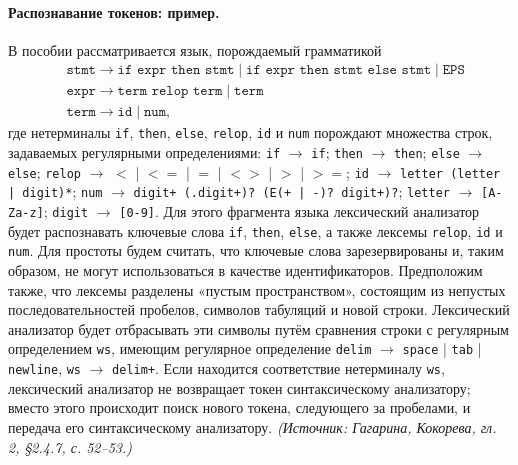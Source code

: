 \documentclass[a4paper,12pt]{article}
\begin{document}
\paragraph{Распознавание токенов: пример.}
В пособии рассматривается язык, порождаемый грамматикой
\[
\begin{aligned}
&\texttt{stmt}\to\texttt{if expr then stmt}\mid\texttt{if expr then stmt else stmt}\mid\texttt{EPS}\\
&\texttt{expr}\to\texttt{term relop term}\mid\texttt{term}\\
&\texttt{term}\to\texttt{id}\mid\texttt{num},
\end{aligned}
\]
где нетерминалы \texttt{if}, \texttt{then}, \texttt{else}, \texttt{relop}, \texttt{id} и \texttt{num} порождают множества строк, задаваемых регулярными определениями: \texttt{if} \(\to\) \texttt{if}; \texttt{then} \(\to\) \texttt{then}; \texttt{else} \(\to\) \texttt{else}; \texttt{relop} \(\to\) \(<\) | \(<=\) | \(=\) | \(<>\) | \(>\) | \(>=\); \texttt{id} \(\to\) \texttt{letter (letter | digit)*}; \texttt{num} \(\to\) \texttt{digit+ (.digit+)? (E(+ | -)? digit+)?}; \texttt{letter} \(\to\) \texttt{[A-Za-z]}; \texttt{digit} \(\to\) \texttt{[0-9]}. Для этого фрагмента языка лексический анализатор будет распознавать ключевые слова \texttt{if}, \texttt{then}, \texttt{else}, а также лексемы \texttt{relop}, \texttt{id} и \texttt{num}. Для простоты будем считать, что ключевые слова зарезервированы и, таким образом, не могут использоваться в качестве идентификаторов. Предположим также, что лексемы разделены «пустым пространством», состоящим из непустых последовательностей пробелов, символов табуляций и новой строки. Лексический анализатор будет отбрасывать эти символы путём сравнения строки с регулярным определением \texttt{ws}, имеющим регулярное определение \texttt{delim} \(\to\) \texttt{space} | \texttt{tab} | \texttt{newline}, \texttt{ws} \(\to\) \texttt{delim+}. Если находится соответствие нетерминалу \texttt{ws}, лексический анализатор не возвращает токен синтаксическому анализатору; вместо этого происходит поиск нового токена, следующего за пробелами, и передача его синтаксическому анализатору.
\textit{(Источник: Гагарина, Кокорева, гл. 2, §2.4.7, с. 52--53.)}
\end{document}
